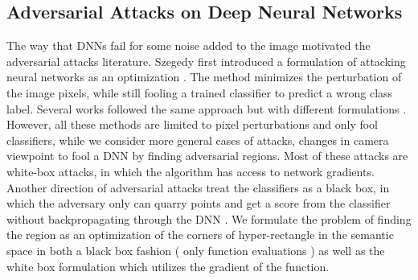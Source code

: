 \subsection{Adversarial Attacks on Deep Neural Networks}
\vspace{-6pt}
The way that DNNs fail for some noise added to the image motivated the adversarial attacks literature. Szegedy first introduced a formulation of attacking neural networks as an optimization \cite{first-attack}. The method minimizes the perturbation of the image pixels, while still fooling a trained classifier to predict a wrong class label. Several works followed the same approach but with different formulations \cite{fast-sign,projected-gradient,deepfool,carlini}. However, all these methods are limited to pixel perturbations and only fool classifiers, while we consider more general cases of attacks, \eg changes in camera viewpoint to fool a DNN by finding adversarial regions. %
Most of these attacks are white-box attacks, in which the algorithm has access to network gradients. Another direction of adversarial attacks treat the classifiers as a black box, in which the adversary only can quarry points and get a score from the classifier without backpropagating through the DNN \cite{reduc-black,zeroth-order-attack}. We formulate the problem of finding the region as an optimization of the corners of hyper-rectangle in the semantic space in both a black box fashion ( only function evaluations ) as well as the white box formulation which utilizes the gradient of the function.

